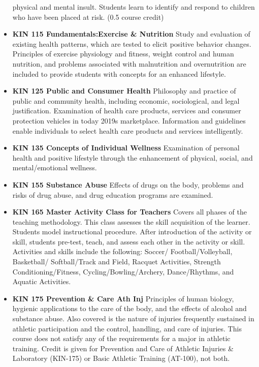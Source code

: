 \documentclass[
  letterpaper,
]{scrbook}
\begin{document}
\begin{itemize}
  physical and mental insult. Students learn to identify and respond to
  children who have been placed at risk. (0.5 course credit)
\item
  \textbf{KIN 115 Fundamentals:Exercise \& Nutrition} Study and
  evaluation of existing health patterns, which are tested to elicit
  positive behavior changes. Principles of exercise physiology and
  fitness, weight control and human nutrition, and problems associated
  with malnutrition and overnutrition are included to provide students
  with concepts for an enhanced lifestyle.
\item
  \textbf{KIN 125 Public and Consumer Health} Philosophy and practice of
  public and community health, including economic, sociological, and
  legal justification. Examination of health care products, services and
  consumer protection vehicles in today 2019s marketplace. Information
  and guidelines enable individuals to select health care products and
  services intelligently.
\item
  \textbf{KIN 135 Concepts of Individual Wellness} Examination of
  personal health and positive lifestyle through the enhancement of
  physical, social, and mental/emotional wellness.
\item
  \textbf{KIN 155 Substance Abuse} Effects of drugs on the body,
  problems and risks of drug abuse, and drug education programs are
  examined.
\item
  \textbf{KIN 165 Master Activity Class for Teachers} Covers all phases
  of the teaching methodology. This class assesses the skill acquisition
  of the learner. Students model instructional procedure. After
  introduction of the activity or skill, students pre-test, teach, and
  assess each other in the activity or skill. Activities and skills
  include the following: Soccer/ Football/Volleyball, Basketball/
  Softball/Track and Field, Racquet Activities, Strength
  Conditioning/Fitness, Cycling/Bowling/Archery, Dance/Rhythms, and
  Aquatic Activities.
\item
  \textbf{KIN 175 Prevention \& Care Ath Inj} Principles of human
  biology, hygienic applications to the care of the body, and the
  effects of alcohol and substance abuse. Also covered is the nature of
  injuries frequently sustained in athletic participation and the
  control, handling, and care of injuries. This course does not satisfy
  any of the requirements for a major in athletic training. Credit is
  given for Prevention and Care of Athletic Injuries \& Laboratory
  (KIN-175) or Basic Athletic Training (AT-100), not both.

\end{itemize}
\end{document}
